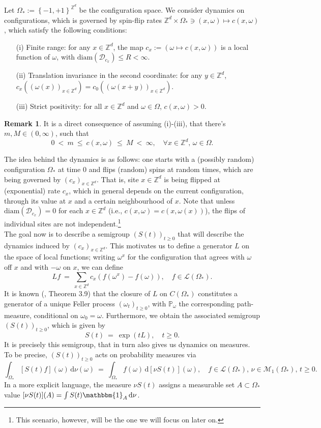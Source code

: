\documentclass[12pt]{article}
\newcommand{\D}{\mathcal{D}}
\renewcommand{\d}{\mathrm{d}}
\newcommand{\Loc}{\mathcal{L}}
\newcommand{\M}{\mathcal{M}}
\renewcommand{\P}{\mathbb{P}}
\newcommand{\Z}{\mathbb{Z}}
\newcommand{\set}[1]{\left\{#1\right\}}
\newcommand{\1}{\mathbbm{1}}
\newcommand{\5}{\vspace{0.5cm}}
\theoremstyle{definition}
\newtheorem{rem}[thm]{Remark}
\begin{document}
Let $\Omega_*:=\set{-1,+1}^{\Z^d}$ be the configuration space. We consider dynamics on configurations, which is governed by spin-flip rates $\Z^d\times\Omega_*\ni(x,\omega)\mapsto c(x,\omega)$, which satisfy the following conditions:
\begin{itemize}
	\item[(i)] Finite range: for any $x\in\Z^d$, the map $c_x:=(\omega\mapsto c(x,\omega))$ is a local function of $\omega$, with $\mathrm{diam}(\D_{c_x})\leq R<\infty$.
	\item[(ii)] Translation invariance in the second coordinate: for any $y\in\Z^d$, $c_x((\omega(x))_{x\in\Z^d})=c_0((\omega(x+y))_{x\in\Z^d})$.
	\item[(iii)] Strict positivity: for all $x\in\Z^d$ and $\omega\in\Omega$, $c(x,\omega)>0$.
\end{itemize}

\begin{rem}
It is a direct consequence of assuming (i)-(iii), that there's $m,M\in(0,\infty)$, such that 
$$0 ~<~ m ~\leq~ c(x,\omega) ~\leq~ M ~<~ \infty, \quad \forall x\in\Z^d,\,\omega\in\Omega.$$
\end{rem}

The idea behind the dynamics is as follows: one starts with a (possibly random) configuration $\Omega_*$ at time $0$ and flips (random) spins at random times, which are being governed by $(c_x)_{x\in\Z^d}$. That is, site $x\in\Z^d$ is being flipped at (exponential) rate $c_x$, which in general depends on the current configuration, through its value at $x$ and a certain neighbourhood of $x$. Note that unless $\mathrm{diam}(\D_{c_x})=0$ for each $x\in\Z^d$ (i.e., $c(x,\omega)=c(x,\omega(x))$), the flips of individual sites are not independent.\footnote{This scenario, however, will be the one we will focus on later on.} \\

The goal now is to describe a semigroup $(S(t))_{t\geq 0}$ that will describe the dynamics induced by $(c_x)_{x\in\Z^d}$. This motivates us to define a generator $L$ on the space of local functions; writing $\omega^x$ for the configuration that agrees with $\omega$ off $x$ and with $-\omega$ on $x$, we can define
$$Lf ~=~ \sum_{x\in\Z^d}c_x(f(\omega^x)-f(\omega)), \quad f\in\Loc(\Omega_*).$$ It is known (\cite{Lig}, Theorem 3.9) that the closure of $L$ on $C(\Omega_*)$ constitutes a generator of a unique Feller process $(\omega_t)_{t\geq 0}$, with $\P_\omega$ the corresponding path-measure, conditional on $\omega_0=\omega$. Furthermore, we obtain the associated semigroup $(S(t))_{t\geq 0}$, which is given by
$$S(t) ~=~ \exp(tL), \quad t\geq 0.$$
It is precisely this semigroup, that in turn also gives us dynamics on measures. To be precise, $(S(t))_{t\geq 0}$ acts on probability measures via	
$$\int_{\Omega_*} [S(t)f](\omega)\,\d\nu(\omega) ~=~ \int_{\Omega_*}f(\omega)\,\d[\nu S(t)](\omega), \quad f\in\Loc(\Omega_*),\,\nu\in\M_1(\Omega_*),\,t\geq 0.$$
In a more explicit language, the measure $\nu S(t)$ assigns a measurable set $A\subset\Omega_*$  value $[\nu S(t)](A)=\int S(t)\1_A\,\d\nu$. \\
\end{document}
